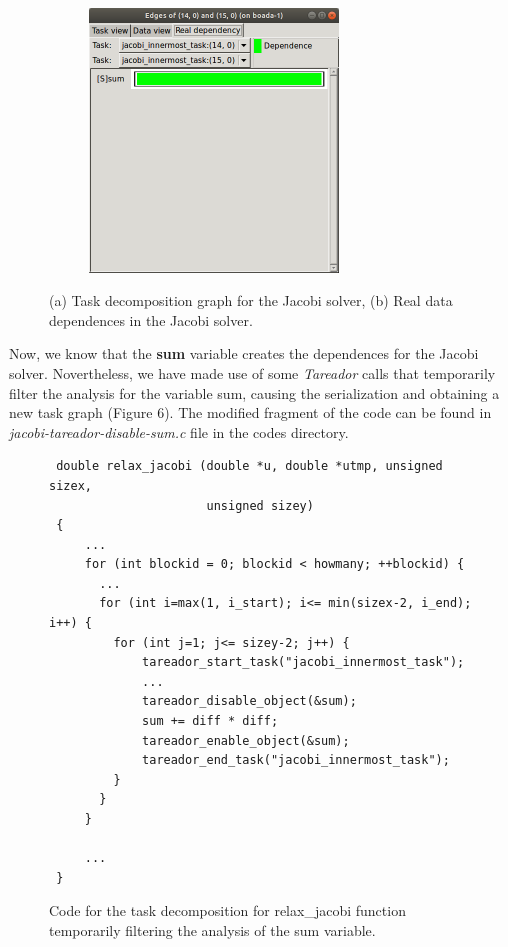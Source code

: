 \documentclass[12pt, a4paper]{article}
\begin{document}
\begin{figure}[H]
\begin{subfigure}{0.45\textwidth}
\end{subfigure}
\begin{subfigure}{0.45\textwidth}
\centering
\includegraphics[scale=0.55,height=7cm]{./images/dependence-jacobi}
\caption{\label{fig:RealDependencyJacobi}}
\end{subfigure}
\caption{(a) Task decomposition graph for the Jacobi solver, (b) Real data dependences in the Jacobi solver.}
\end{figure}

Now, we know that the \textbf{sum} variable creates the dependences for the Jacobi solver. Novertheless, we have made use of some \textit{Tareador} calls that temporarily filter the analysis for the variable sum, causing the serialization and obtaining a new task graph (Figure 6). The modified fragment of the code can be found in \textit{jacobi-tareador-disable-sum.c} file in the codes directory.

\begin{figure}[H]
\begin{lstlisting}
 double relax_jacobi (double *u, double *utmp, unsigned sizex,
 					  unsigned sizey)
 {
 	 ...
     for (int blockid = 0; blockid < howmany; ++blockid) {
       ...
       for (int i=max(1, i_start); i<= min(sizex-2, i_end); i++) {
         for (int j=1; j<= sizey-2; j++) {
			 tareador_start_task("jacobi_innermost_task");
			 ...
			 tareador_disable_object(&sum);
			 sum += diff * diff;
			 tareador_enable_object(&sum);
			 tareador_end_task("jacobi_innermost_task");
	 	 }
       }
     }

     ...
 }
\end{lstlisting}
\label{code:tareador-relax-jacobi-disable-sum}
\caption{Code for the task decomposition for relax\_jacobi function temporarily filtering the analysis of the sum variable.}
\end{figure}
\end{document}
